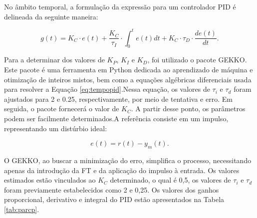 \documentclass[12pt,           %
a4paper,                       %
openany,                       %
oneside,                       %
chapter=TITLE,                 %
english,                       %
spanish,                       %
brazil,                        %
sumario=tradicional]{abntex2}  %
\begin{document}
\begin{OnehalfSpace}
\begin{figure}[H]
\label{fig:mfpidex}
\end{figure}
\vspace*{-.7cm}
{\raggedright {}}

No âmbito temporal, a formulação da expressão para um controlador PID é delineada da seguinte maneira:

\begin{equation}
     g(t) = K_C \cdot e(t) + \frac{K_C}{\tau_I}\cdot \int_0^t e(t) dt + K_C\cdot \tau_D \cdot \frac{de(t)}{dt}.
    \label{eq:tempopid}
\end{equation}

Para a determinar dos valores de $K_P$, $K_I$ e $K_D$, foi utilizado o pacote GEKKO\cite{gekko}. Este pacote é uma ferramenta em Python dedicada ao aprendizado de máquina e otimização de inteiros mistos, bem como a equações algébricas diferenciais usada para resolver a Equação \ref{eq:tempopid}.Nessa equação, os valores de $\tau_i$ e $\tau_d$ foram ajustados para 2 e 0.25, respectivamente, por meio de tentativa e erro. Em seguida, o pacote fornecerá o valor de $K_C$. A partir desse ponto, os parâmetros podem ser facilmente determinados.A referência consiste em um impulso, representando um distúrbio ideal:

\begin{equation}
     e(t) = r(t) - y_m(t).
    \label{eq:erro}
\end{equation}

O GEKKO, ao buscar a minimização do erro, simplifica o processo, necessitando apenas da introdução da FT e da aplicação do impulso à entrada. Os valores estimados estão vinculados ao $K_C$ determinado, o qual é 0,5, os valores de $\tau_i$ e $\tau_d$ foram previamente estabelecidos como 2 e 0,25. Os valores dos ganhos proporcional, derivativo e integral do PID estão apresentados na Tabela \ref{tab:parcp}.



\end{OnehalfSpace}
\end{document}
